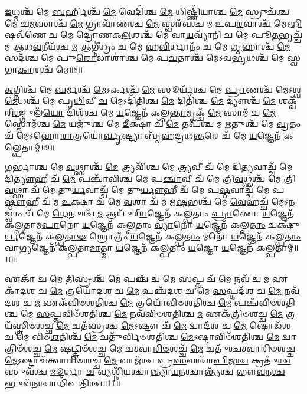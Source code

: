 \-\ul{𑌇}\-𑌧𑍍𑌮𑌶𑍍𑌚᳴ 𑌮𑍇 \ul{𑌬}\-𑌰𑍍𑌹𑌿𑌶𑍍𑌚᳴ \ul{𑌮𑍇} 𑌵𑍇𑌦𑌿᳴𑌶𑍍𑌚 \ul{𑌮𑍇} 𑌧𑌿𑌷𑍍𑌣𑌿᳴𑌯𑌾𑌶𑍍𑌚 \ul{𑌮𑍇} 𑌸𑍍𑌰𑍁𑌚᳴𑌶𑍍𑌚 𑌮𑍇 𑌚\-\ul{𑌮}\-𑌸𑌾𑌶𑍍𑌚᳴ \ul{𑌮𑍇} 𑌗𑍍𑌰𑌾𑌵𑌾᳴𑌣𑌶𑍍𑌚 \ul{𑌮𑍇} 𑌸𑍍𑌵𑌰᳴𑌵𑌶𑍍𑌚 𑌮 𑌉𑌪\-\ul{𑌰}\-𑌵𑌾𑌶𑍍𑌚᳴ 𑌮𑍇𑌽\-\ul{𑌧𑌿}\-𑌷𑌵᳴𑌣𑍇 𑌚 𑌮𑍇 𑌦𑍍𑌰𑍋𑌣𑌕\-\ul{𑌲}\-𑌶𑌶𑍍𑌚᳴ 𑌮𑍇 𑌵𑌾\-\ul{𑌯}\-𑌵𑍍𑌯𑌾᳴𑌨𑌿 𑌚 𑌮𑍇 𑌪𑍂\-\ul{𑌤}\-𑌭𑍃𑌚𑍍𑌚᳴ 𑌮 𑌆𑌧\-\ul{𑌵}\-𑌨𑍀𑌯᳴𑌶𑍍𑌚 \ul{𑌮} 𑌆𑌗𑍍𑌨𑍀॑𑌧𑍍𑌰𑌂 𑌚 𑌮𑍇 𑌹\-\ul{𑌵𑌿}\-𑌰𑍍𑌧𑌾𑌨𑌂᳴ 𑌚 𑌮𑍇 \ul{𑌗𑍃}\-𑌹𑌾𑌶𑍍𑌚᳴ \ul{𑌮𑍇} 𑌸𑌦᳴𑌶𑍍𑌚 𑌮𑍇 𑌪𑍁\-\ul{𑌰𑍋}\-𑌡𑌾𑌶𑌾॑𑌶𑍍𑌚 𑌮𑍇 𑌪\-\ul{𑌚}\-𑌤𑌾𑌶𑍍𑌚᳴ 𑌮𑍇𑌽𑌵\-\ul{𑌭𑍃}\-𑌥𑌶𑍍𑌚᳴ 𑌮𑍇 𑌸𑍍𑌵𑌗𑌾\-\ul{𑌕𑌾}\-𑌰𑌶𑍍𑌚᳴ 𑌮𑍇॥8॥ 

\-\ul{𑌅}\-𑌗𑍍𑌨𑌿𑌶𑍍𑌚᳴ 𑌮𑍇 \ul{𑌘}\-𑌰𑍍𑌮𑌶𑍍𑌚᳴ \ul{𑌮𑍇}\-𑌽𑌰𑍍𑌕𑌶𑍍𑌚᳴ \ul{𑌮𑍇} 𑌸𑍂𑌰𑍍𑌯᳴𑌶𑍍𑌚 𑌮𑍇 \ul{𑌪𑍍𑌰𑌾}\-𑌣𑌶𑍍𑌚᳴ 𑌮𑍇𑌽𑌶𑍍𑌵\-\ul{𑌮𑍇}\-𑌧𑌶𑍍𑌚᳴ 𑌮𑍇 𑌪𑍃\-\ul{𑌥𑌿}\-𑌵𑍀 \ul{𑌚} 𑌮𑍇𑌽𑌦𑌿᳴𑌤𑌿𑌶𑍍𑌚 \ul{𑌮𑍇} 𑌦𑌿𑌤𑌿᳴𑌶𑍍𑌚 \ul{𑌮𑍇} 𑌦𑍍𑌯𑍗𑌶𑍍𑌚᳴ \ul{𑌮𑍇} 𑌶𑌕𑍍𑌵᳴𑌰𑍀\-\ul{𑌰}\-𑌙𑍍𑌗𑍁𑌲᳴\-\ul{𑌯𑍋} 𑌦𑌿𑌶᳴𑌶𑍍𑌚 𑌮𑍇 \ul{𑌯}\-𑌜𑍍𑌞𑍇𑌨᳴ 𑌕𑌲𑍍𑌪\-\ul{𑌨𑍍𑌤𑌾}\-𑌮𑍃𑌕𑍍𑌚᳴ \ul{𑌮𑍇} 𑌸𑌾𑌮᳴ 𑌚 \ul{𑌮𑍇} 𑌸𑍍𑌤𑍋𑌮᳴𑌶𑍍𑌚 \ul{𑌮𑍇} 𑌯𑌜𑍁᳴𑌶𑍍𑌚 𑌮𑍇 \ul{𑌦𑍀}\-𑌕𑍍𑌷𑌾 𑌚᳴ \ul{𑌮𑍇} 𑌤𑌪᳴𑌶𑍍𑌚 𑌮 \ul{𑌋}\-𑌤𑍁𑌶𑍍𑌚᳴ 𑌮𑍇 \ul{𑌵𑍍𑌰}\-𑌤𑌂 𑌚᳴ 𑌮𑍇𑌽𑌹𑍋\-\ul{𑌰𑌾}\-𑌤𑍍𑌰𑌯𑍋॑\-\ul{𑌰𑍍𑌵𑍃}\-𑌷𑍍𑌟𑍍𑌯𑌾 𑌬𑍃᳴𑌹𑌦𑍍𑌰𑌥\-\ul{𑌨𑍍𑌤}\-𑌰𑍇 𑌚᳴ 𑌮𑍇 \ul{𑌯}\-𑌜𑍍𑌞𑍇𑌨᳴ 𑌕𑌲𑍍𑌪𑍇𑌤𑌾𑌮𑍍॥9॥ 

𑌗𑌰𑍍𑌭𑌾॑𑌶𑍍𑌚 𑌮𑍇 \ul{𑌵}\-𑌥𑍍𑌸𑌾𑌶𑍍𑌚᳴ \ul{𑌮𑍇} 𑌤𑍍𑌰𑍍𑌯𑌵𑌿᳴𑌶𑍍𑌚 𑌮𑍇 \ul{𑌤𑍍𑌰𑍍𑌯}\-𑌵𑍀 𑌚᳴ 𑌮𑍇 𑌦𑌿\-\ul{𑌤𑍍𑌯}\-𑌵𑌾𑌚𑍍𑌚᳴ 𑌮𑍇 𑌦𑌿\-\ul{𑌤𑍍𑌯𑍗}\-𑌹𑍀 𑌚᳴ \ul{𑌮𑍇} 𑌪𑌞𑍍𑌚𑌾᳴𑌵𑌿𑌶𑍍𑌚 𑌮𑍇 𑌪\-\ul{𑌞𑍍𑌚𑌾}\-𑌵𑍀 𑌚᳴ 𑌮𑍇 𑌤𑍍𑌰𑌿\-\ul{𑌵}\-𑌥𑍍𑌸𑌶𑍍𑌚᳴ 𑌮𑍇 𑌤𑍍𑌰𑌿\-\ul{𑌵}\-𑌥𑍍𑌸𑌾 𑌚᳴ 𑌮𑍇 𑌤𑍁\-\ul{𑌰𑍍𑌯}\-𑌵𑌾𑌚𑍍𑌚᳴ 𑌮𑍇 𑌤𑍁\-\ul{𑌰𑍍𑌯𑍗}\-𑌹𑍀 𑌚᳴ 𑌮𑍇 𑌪\-\ul{𑌷𑍍𑌠}\-𑌵𑌾𑌚𑍍𑌚᳴ 𑌮𑍇 𑌪\-\ul{𑌷𑍍𑌠𑍗}\-𑌹𑍀 𑌚᳴ 𑌮 \ul{𑌉}\-𑌕𑍍𑌷𑌾 𑌚᳴ 𑌮𑍇 \ul{𑌵}\-𑌶𑌾 𑌚᳴ 𑌮 𑌋\-\ul{𑌷}\-𑌭𑌶𑍍𑌚᳴ 𑌮𑍇 \ul{𑌵𑍇}\-𑌹𑌚𑍍𑌚᳴ 𑌮𑍇𑌽\-\ul{𑌨}\-𑌡𑍍𑌵𑌾𑌂 𑌚᳴ 𑌮𑍇 \ul{𑌧𑍇}\-𑌨𑍁𑌶𑍍𑌚᳴ \ul{𑌮} 𑌆𑌯𑍁᳴𑌰𑍍‌\-\ul{𑌯}\-𑌜𑍍𑌞𑍇𑌨᳴ 𑌕𑌲𑍍𑌪𑌤𑌾𑌂 \ul{𑌪𑍍𑌰𑌾}\-𑌣𑍋 \ul{𑌯}\-𑌜𑍍𑌞𑍇𑌨᳴ 𑌕𑌲𑍍𑌪𑌤𑌾𑌮\-\ul{𑌪𑌾}\-𑌨𑍋 \ul{𑌯}\-𑌜𑍍𑌞𑍇𑌨᳴ 𑌕𑌲𑍍𑌪𑌤𑌾𑌂 \ul{𑌵𑍍𑌯𑌾}\-𑌨𑍋 \ul{𑌯}\-𑌜𑍍𑌞𑍇𑌨᳴ 𑌕𑌲𑍍𑌪\-\ul{𑌤𑌾𑌂} 𑌚𑌕𑍍𑌷𑍁᳴\-\ul{𑌰𑍍𑌯}\-𑌜𑍍𑌞𑍇𑌨᳴ 𑌕𑌲𑍍𑌪\-\ul{𑌤𑌾}\-\-\ul{𑍟} 𑌶𑍍𑌰𑍋𑌤𑍍𑌰𑌂᳴ \ul{𑌯}\-𑌜𑍍𑌞𑍇𑌨᳴ 𑌕𑌲𑍍𑌪\-\ul{𑌤𑌾𑌂} 𑌮𑌨𑍋᳴ \ul{𑌯}\-𑌜𑍍𑌞𑍇𑌨᳴ 𑌕𑌲𑍍𑌪\-\ul{𑌤𑌾𑌂} 𑌵𑌾\-\ul{𑌗𑍍𑌯}\-𑌜𑍍𑌞𑍇𑌨᳴ 𑌕𑌲𑍍𑌪𑌤𑌾\-\ul{𑌮𑌾}\-𑌤𑍍𑌮𑌾 \ul{𑌯}\-𑌜𑍍𑌞𑍇𑌨᳴ 𑌕𑌲𑍍𑌪𑌤𑌾𑌂 \ul{𑌯}\-𑌜𑍍𑌞𑍋 \ul{𑌯}\-𑌜𑍍𑌞𑍇𑌨᳴ 𑌕𑌲𑍍𑌪𑌤𑌾𑌮𑍍॥10॥ 

𑌏𑌕𑌾᳴ 𑌚 𑌮𑍇 \ul{𑌤𑌿}\-𑌸𑍍𑌰𑌶𑍍𑌚᳴ \ul{𑌮𑍇} 𑌪𑌞𑍍𑌚᳴ 𑌚 𑌮𑍇 \ul{𑌸}\-𑌪𑍍𑌤 𑌚᳴ \ul{𑌮𑍇} 𑌨𑌵᳴ 𑌚 \ul{𑌮} 𑌏𑌕𑌾᳴𑌦𑌶 𑌚 \ul{𑌮𑍇} 𑌤𑍍𑌰𑌯𑍋᳴𑌦𑌶 𑌚 \ul{𑌮𑍇} 𑌪𑌞𑍍𑌚᳴𑌦𑌶 𑌚 𑌮𑍇 \ul{𑌸}\-𑌪𑍍𑌤𑌦᳴𑌶 𑌚 \ul{𑌮𑍇} 𑌨𑌵᳴𑌦𑌶 𑌚 \ul{𑌮} 𑌏𑌕᳴𑌵𑌿𑍞𑌶𑌤𑌿𑌶𑍍𑌚 \ul{𑌮𑍇} 𑌤𑍍𑌰𑌯𑍋᳴𑌵𑌿𑍞𑌶𑌤𑌿𑌶𑍍𑌚 \ul{𑌮𑍇} 𑌪𑌞𑍍𑌚᳴𑌵𑌿𑍞𑌶𑌤𑌿𑌶𑍍𑌚 𑌮𑍇 \ul{𑌸}\-𑌪𑍍𑌤𑌵𑌿𑍞᳴𑌶𑌤𑌿𑌶𑍍𑌚 \ul{𑌮𑍇} 𑌨𑌵᳴𑌵𑌿𑍞𑌶𑌤𑌿𑌶𑍍𑌚 \ul{𑌮} 𑌏𑌕᳴𑌤𑍍𑌰𑌿𑍞𑌶𑌚𑍍𑌚 \ul{𑌮𑍇} 𑌤𑍍𑌰𑌯᳴𑌸𑍍𑌤𑍍𑌰𑌿𑍞𑌶𑌚𑍍𑌚 \ul{𑌮𑍇} 𑌚𑌤᳴𑌸𑍍𑌰𑌶𑍍𑌚 \ul{𑌮𑍇}\-𑌽𑌷𑍍𑌟𑍗 𑌚᳴ \ul{𑌮𑍇} 𑌦𑍍𑌵𑌾𑌦᳴𑌶 𑌚 \ul{𑌮𑍇} 𑌷𑍋𑌡᳴𑌶 𑌚 𑌮𑍇 𑌵𑌿𑍞\-\ul{𑌶}\-𑌤𑌿𑌶𑍍𑌚᳴ \ul{𑌮𑍇} 𑌚𑌤𑍁᳴𑌰𑍍𑌵𑌿𑍞𑌶𑌤𑌿𑌶𑍍𑌚 \ul{𑌮𑍇}\-𑌽𑌷𑍍𑌟𑌾𑌵𑌿𑍞᳴𑌶𑌤𑌿𑌶𑍍𑌚 \ul{𑌮𑍇} 𑌦𑍍𑌵𑌾𑌤𑍍𑌰𑌿𑍞᳴𑌶𑌚𑍍𑌚 \ul{𑌮𑍇} 𑌷𑌟𑍍𑌤𑍍𑌰𑌿𑍞᳴𑌶𑌚𑍍𑌚 𑌮𑍇 𑌚𑌤𑍍𑌵𑌾\-\ul{𑌰𑌿}\-\-\ul{𑍞}\-𑌶𑌚𑍍𑌚᳴ \ul{𑌮𑍇} 𑌚𑌤𑍁᳴𑌶𑍍𑌚𑌤𑍍𑌵𑌾𑌰𑌿𑍞𑌶𑌚𑍍𑌚 \ul{𑌮𑍇}\-𑌽𑌷𑍍𑌟𑌾𑌚᳴𑌤𑍍𑌵𑌾𑌰𑌿𑍞𑌶𑌚𑍍𑌚 \ul{𑌮𑍇} 𑌵𑌾𑌜᳴𑌶𑍍𑌚 𑌪𑍍𑌰\-\ul{𑌸}\-𑌵𑌶𑍍𑌚𑌾᳴\-\ul{𑌪𑌿}\-𑌜\-\ul{𑌶𑍍𑌚} 𑌕𑍍𑌰𑌤𑍁᳴\-\ul{𑌶𑍍𑌚} 𑌸𑍁𑌵᳴𑌶𑍍𑌚 \ul{𑌮𑍂}\-𑌰𑍍𑌧𑌾 \ul{𑌚} 𑌵𑍍𑌯𑌶𑍍𑌨𑌿᳴𑌯𑌶𑍍𑌚𑌾𑌨𑍍𑌤𑍍𑌯𑌾\-\ul{𑌯}\-𑌨𑌶𑍍𑌚𑌾𑌨𑍍𑌤𑍍𑌯᳴𑌶𑍍𑌚 𑌭𑍗\-\ul{𑌵}\-𑌨\-\ul{𑌶𑍍𑌚} 𑌭𑍁𑌵᳴\-\ul{𑌨}\-𑌶𑍍𑌚𑌾𑌧𑌿᳴𑌪𑌤𑌿𑌶𑍍𑌚॥11॥ 

